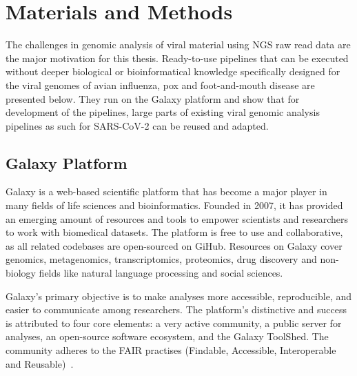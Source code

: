\chapter{Materials and Methods}\label{chap:methods}
The challenges in genomic analysis of viral material using NGS raw read data are the major motivation for this thesis. Ready-to-use pipelines that can be executed without deeper biological or bioinformatical knowledge specifically designed for the viral genomes of avian influenza, pox and foot-and-mouth disease are presented below. They run on the Galaxy platform and show that for development of the pipelines, large parts of existing viral genomic analysis pipelines as such for SARS-CoV-2 can be reused and adapted.

\section{Galaxy Platform}\label{sec:galaxy}
Galaxy is a web-based scientific platform that has become a major player in many fields of life sciences and bioinformatics. Founded in 2007, it has provided an emerging amount of resources and tools to empower scientists and researchers to work with biomedical datasets. The platform is free to use and collaborative, as all related codebases are open-sourced on GiHub. Resources on Galaxy cover genomics, metagenomics, transcriptomics, proteomics, drug discovery and non-biology fields like natural language processing and social sciences.

Galaxy's primary objective is to make analyses more accessible, reproducible, and easier to communicate among researchers. The platform's distinctive and success is attributed to four core elements: a very active community, a public server for analyses, an open-source software ecosystem, and the Galaxy ToolShed. The community adheres to the FAIR practises (Findable, Accessible, Interoperable and Reusable)~\cite{10.1093/nar/gkac247}.

